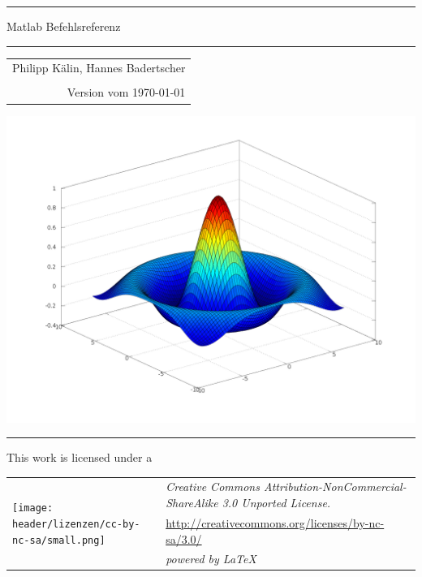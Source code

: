 \def\thickhrulefill{\leavevmode \leaders \hrule height 1pt\hfill \kern \z@}

\begin{titlepage}
    \vspace{10cm} %
    \hrule height 4pt
    \begin{flushleft}
      \huge Matlab Befehlsreferenz
    \end{flushleft}
    \hrule height 4pt
    \par
    \begin{flushright}
      \begin{tabular}{r}
        \LARGE Philipp Kälin, Hannes Badertscher \\
        \hspace{1mm} \\
        \LARGE Version vom \today
      \end{tabular}
    \end{flushright}
    
    \vfill
      \begin{center}
        \includegraphics[width=20cm]{images/lorenz.png}
      \end{center}
    \vfill
    
    \hrule height 1.75pt \vspace{1mm}
    This work is licensed under a \newline
    \begin{tabular}{ll}
        \multirow{3}{*}{\texttt{[image: header/lizenzen/cc-by-nc-sa/small.png]}} &
        \textit{Creative Commons Attribution-NonCommercial-ShareAlike 3.0
        Unported License.}
      \\
        &
        \url{http://creativecommons.org/licenses/by-nc-sa/3.0/}
      \\
      	&     \textit{powered by \LaTeX}
    \end{tabular}\\
    
\end{titlepage}%
\setcounter{footnote}{0}%